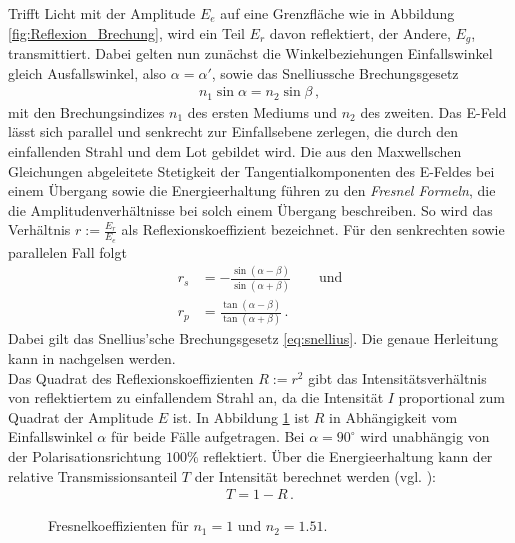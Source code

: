 \documentclass[12pt,a4paper,titlepage,headinclude,bibtotoc]{scrartcl}
\begin{document}
Trifft Licht mit der Amplitude $E_e$ auf eine Grenzfläche wie in Abbildung \ref{fig:Reflexion_Brechung}, wird ein Teil $E_r$ davon reflektiert, der Andere, $E_g$, transmittiert.
Dabei gelten nun zunächst die Winkelbeziehungen \glqq Einfallswinkel gleich Ausfallswinkel\grqq , also $\alpha=\alpha'$, sowie das Snelliussche Brechungsgesetz \cite[S.6]{saleh-teich}
\begin{align}
	n_1\sin\alpha=n_2\sin\beta\,,
	\label{eq:snellius}
\end{align}
mit den Brechungsindizes $n_1$ des ersten Mediums und $n_2$ des zweiten.
Das E-Feld lässt sich parallel und senkrecht zur Einfallsebene zerlegen, die durch den einfallenden Strahl und dem Lot gebildet wird.
Die aus den Maxwellschen Gleichungen abgeleitete Stetigkeit der Tangentialkomponenten des E-Feldes bei einem Übergang sowie die Energieerhaltung führen zu den \emph{Fresnel Formeln}, die die Amplitudenverhältnisse bei solch einem Übergang beschreiben.
So wird das Verhältnis $r:=\frac{E_r}{E_e}$ als Reflexionskoeffizient bezeichnet.
Für den senkrechten sowie parallelen Fall folgt
\begin{align}
	r_s&=-\frac{\sin(\alpha-\beta)}{\sin(\alpha+\beta)}\qquad \text{und}
	\label{eq:r_s}\\
	r_p&=\frac{\tan(\alpha-\beta)}{\tan(\alpha+\beta)}\,.
	\label{eq:r_p}
\end{align}
Dabei gilt das Snellius'sche Brechungsgesetz \eqref{eq:snellius}.
Die genaue Herleitung kann in \cite[S.237ff.]{demtroeder2} nachgelsen werden.\\
Das Quadrat des Reflexionskoeffizienten $R:=r^2$ gibt das Intensitätsverhältnis von reflektiertem zu einfallendem Strahl an, da die Intensität $I$ proportional zum Quadrat der Amplitude $E$ ist.
In Abbildung \ref{fig:fresnelkoeff} ist $R$ in Abhängigkeit vom Einfallswinkel $\alpha$ für beide Fälle aufgetragen.
Bei $\alpha=90^\circ$ wird unabhängig von der Polarisationsrichtung $100\%$ reflektiert.
Über die Energieerhaltung kann der relative Transmissionsanteil $T$ der Intensität berechnet werden (vgl. \cite[S.239]{demtroeder2}):
\begin{align}
	T=1-R\,.
\end{align}

\begin{figure}[!h]
	\centering
	
	\caption{Fresnelkoeffizienten für $n_1=1$ und $n_2=1.51$.}
	\label{fig:fresnelkoeff}
\end{figure}
\end{document}
